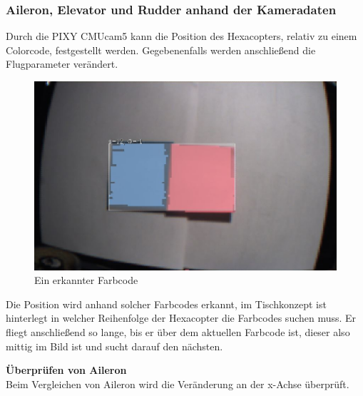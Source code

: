     \subsubsection{Aileron, Elevator und Rudder anhand der Kameradaten}
    Durch die PIXY CMUcam5 kann die Position des Hexacopters, relativ zu einem Colorcode, festgestellt werden. Gegebenenfalls werden anschließend die Flugparameter verändert.

    \begin{figure} [tbh]
      \begin{centering}
        \includegraphics[width = \textwidth]{Bilder/Farbcode_erkannt}
      \par\end{centering}
      \caption{Ein erkannter Farbcode}
      \label{Farbcode_erkannt}
    \end{figure}
    Die Position wird anhand solcher Farbcodes erkannt, im Tischkonzept ist hinterlegt in welcher Reihenfolge der Hexacopter die Farbcodes suchen muss.
    Er fliegt anschließend so lange, bis er über dem aktuellen Farbcode ist, dieser also mittig im Bild ist und sucht darauf den nächsten.


    \textbf{Überprüfen von Aileron}\\
    Beim Vergleichen von Aileron wird die Veränderung an der x-Achse überprüft. 

